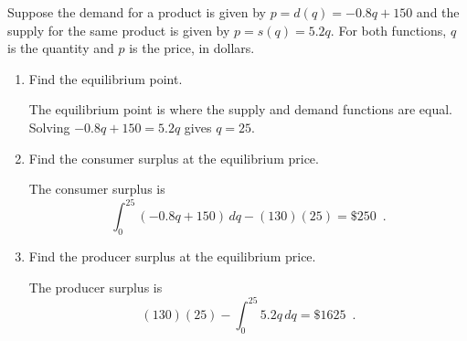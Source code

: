 \begin{example}
Suppose the demand for a product is given by $p=d(q)=-0.8q+150$ and the supply for the same product is given by $p=s(q)=5.2q$. For both functions, $q$ is the quantity and $p$ is the price, in dollars.
\begin{enumerate}[label=(\alph*)]
  \item Find the equilibrium point.

  \begin{solution}
The equilibrium point is where the supply and demand functions are equal. Solving $-0.8q+150=5.2q$ gives $q=25$.
  \end{solution}
  \item Find the consumer surplus at the equilibrium price.

  \begin{solution}
    The consumer surplus is
    $$\int_0^{25}(-0.8q+150)\,dq - (130)(25) = \$250 \enspace .$$
  \end{solution}
  \item Find the producer surplus at the equilibrium price.

\begin{solution}
  The producer surplus is
  $$(130)(25) - \int_0^{25}5.2q\,dq = \$1625 \enspace .$$
  \end{solution}
\end{enumerate}
\end{example}


